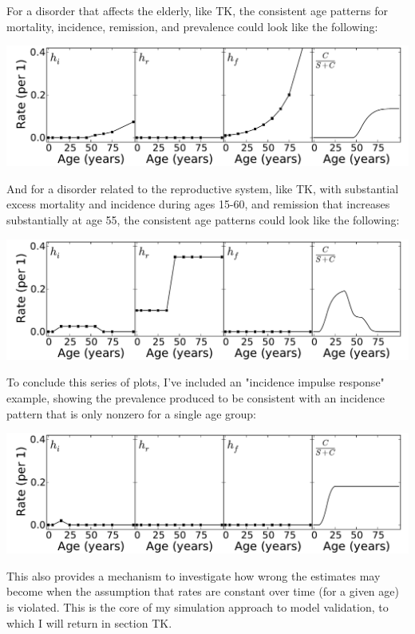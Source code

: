 For a disorder that affects the elderly, like TK, the consistent age
patterns for mortality, incidence, remission, and prevalence could
look like the following: 

\includegraphics[width=\textwidth]{forward-sim-old_age.pdf}

And for a disorder related to the reproductive system, like TK, with
substantial excess mortality and incidence during ages 15-60, and
remission that increases substantially at age 55, the consistent age
patterns could look like the following: 

\includegraphics[width=\textwidth]{forward-sim-reproductive.pdf}

To conclude this series of plots, I've included an "incidence impulse
response" example, showing the prevalence produced to be consistent
with an incidence pattern that is only nonzero for a single age group:

\includegraphics[width=\textwidth]{forward-sim-incidence_pulse.pdf}

This also provides a mechanism to investigate how wrong the estimates
may become when the assumption that rates are constant over time (for
a given age) is violated. This is the core of my simulation approach
to model validation, to which I will return in section TK.

